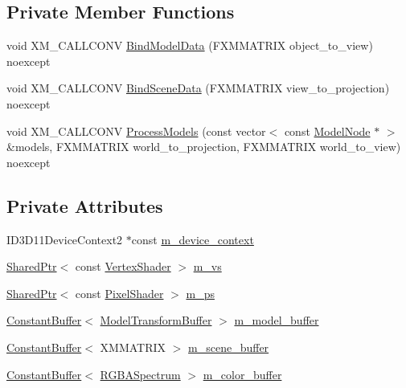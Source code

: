 \subsection*{Private Member Functions}
\begin{DoxyCompactItemize}
\item 
void X\+M\+\_\+\+C\+A\+L\+L\+C\+O\+NV \hyperlink{classmage_1_1_wireframe_pass_a7add5e805d8d8afe450e48a553c76176}{Bind\+Model\+Data} (F\+X\+M\+M\+A\+T\+R\+IX object\+\_\+to\+\_\+view) noexcept
\item 
void X\+M\+\_\+\+C\+A\+L\+L\+C\+O\+NV \hyperlink{classmage_1_1_wireframe_pass_ac77daacc9476b78474eeafc5822976f1}{Bind\+Scene\+Data} (F\+X\+M\+M\+A\+T\+R\+IX view\+\_\+to\+\_\+projection) noexcept
\item 
void X\+M\+\_\+\+C\+A\+L\+L\+C\+O\+NV \hyperlink{classmage_1_1_wireframe_pass_ad32bdc71fa20d4084a01660ae4bc8a7f}{Process\+Models} (const vector$<$ const \hyperlink{classmage_1_1_model_node}{Model\+Node} $\ast$ $>$ \&models, F\+X\+M\+M\+A\+T\+R\+IX world\+\_\+to\+\_\+projection, F\+X\+M\+M\+A\+T\+R\+IX world\+\_\+to\+\_\+view) noexcept
\end{DoxyCompactItemize}
\subsection*{Private Attributes}
\begin{DoxyCompactItemize}
\item 
I\+D3\+D11\+Device\+Context2 $\ast$const \hyperlink{classmage_1_1_wireframe_pass_aa3e85e2688c424fc369da6c00691d466}{m\+\_\+device\+\_\+context}
\item 
\hyperlink{namespacemage_a1e01ae66713838a7a67d30e44c67703e}{Shared\+Ptr}$<$ const \hyperlink{classmage_1_1_vertex_shader}{Vertex\+Shader} $>$ \hyperlink{classmage_1_1_wireframe_pass_a05b72753672603e749b7321d01b00b66}{m\+\_\+vs}
\item 
\hyperlink{namespacemage_a1e01ae66713838a7a67d30e44c67703e}{Shared\+Ptr}$<$ const \hyperlink{namespacemage_ac98506b7edd999ea43ec46fbd0330238}{Pixel\+Shader} $>$ \hyperlink{classmage_1_1_wireframe_pass_a2da40456136a7df9926d2672bcf6b5c2}{m\+\_\+ps}
\item 
\hyperlink{structmage_1_1_constant_buffer}{Constant\+Buffer}$<$ \hyperlink{structmage_1_1_model_transform_buffer}{Model\+Transform\+Buffer} $>$ \hyperlink{classmage_1_1_wireframe_pass_a1aa27e1ce7b07c2bf9e4146717d84b42}{m\+\_\+model\+\_\+buffer}
\item 
\hyperlink{structmage_1_1_constant_buffer}{Constant\+Buffer}$<$ X\+M\+M\+A\+T\+R\+IX $>$ \hyperlink{classmage_1_1_wireframe_pass_a09db50fcfc6b48247d3075531c5189a6}{m\+\_\+scene\+\_\+buffer}
\item 
\hyperlink{structmage_1_1_constant_buffer}{Constant\+Buffer}$<$ \hyperlink{structmage_1_1_r_g_b_a_spectrum}{R\+G\+B\+A\+Spectrum} $>$ \hyperlink{classmage_1_1_wireframe_pass_ab046a411db5ef3cd9c291ea1bea7cdbc}{m\+\_\+color\+\_\+buffer}
\end{DoxyCompactItemize}


